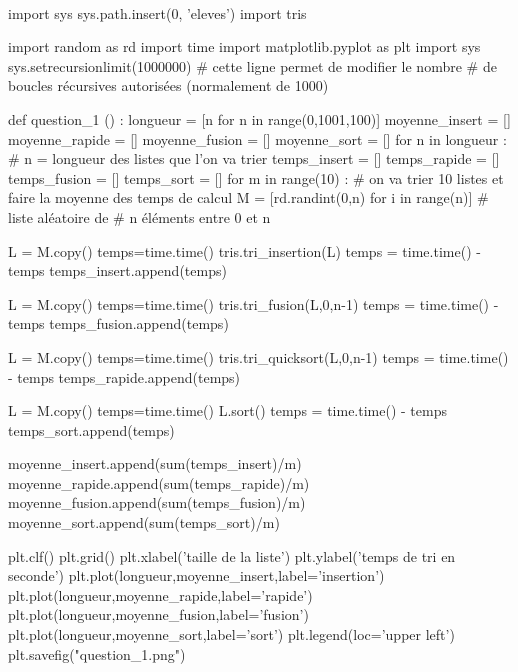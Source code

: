 \ifprof
\begin{corrige}

\question\ 

\begin{python}
import sys
sys.path.insert(0, 'eleves')
import tris

import random as rd
import time
import matplotlib.pyplot as plt
import sys
sys.setrecursionlimit(1000000) # cette ligne permet de modifier le nombre
# de boucles récursives autorisées (normalement de 1000)

def question_1 () :
    longueur = [n for n in range(0,1001,100)]
    moyenne_insert = []
    moyenne_rapide = []
    moyenne_fusion = []
    moyenne_sort = []
    for n in longueur :
        # n = longueur des listes que l'on va trier
        temps_insert = []
        temps_rapide = []
        temps_fusion = []
        temps_sort = []
        for m in range(10) :
            # on va trier 10 listes et faire la moyenne des temps de calcul
            M = [rd.randint(0,n) for i in range(n)] # liste aléatoire de
                        # n éléments entre 0 et n
                        
            L = M.copy()            
            temps=time.time()
            tris.tri_insertion(L)
            temps = time.time() - temps
            temps_insert.append(temps)

            L = M.copy()
            temps=time.time()
            tris.tri_fusion(L,0,n-1)
            temps = time.time() - temps
            temps_fusion.append(temps)
            
            L = M.copy()
            temps=time.time()
            tris.tri_quicksort(L,0,n-1)
            temps = time.time() - temps
            temps_rapide.append(temps)
            
            L = M.copy()
            temps=time.time()
            L.sort()
            temps = time.time() - temps
            temps_sort.append(temps)
            
        moyenne_insert.append(sum(temps_insert)/m)
        moyenne_rapide.append(sum(temps_rapide)/m)
        moyenne_fusion.append(sum(temps_fusion)/m)
        moyenne_sort.append(sum(temps_sort)/m)

    plt.clf()
    plt.grid()
    plt.xlabel('taille de la liste')
    plt.ylabel('temps de tri en seconde')
    plt.plot(longueur,moyenne_insert,label='insertion')
    plt.plot(longueur,moyenne_rapide,label='rapide')
    plt.plot(longueur,moyenne_fusion,label='fusion')
    plt.plot(longueur,moyenne_sort,label='sort')
    plt.legend(loc='upper left')
    plt.savefig("question_1.png")
\end{python}



\end{corrige}
